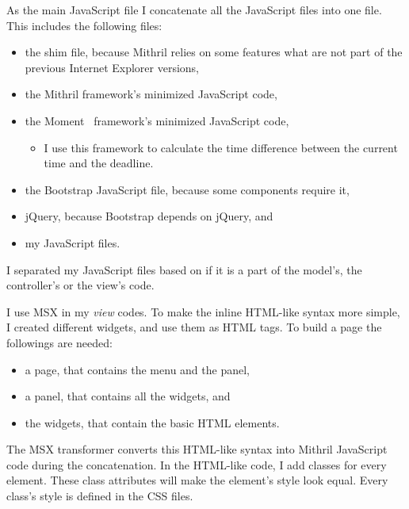 
As the main JavaScript file I concatenate all the JavaScript files into one file. This includes the following files: 
\begin{itemize}
	\item the shim file, because Mithril relies on some features what are not part of the previous Internet Explorer versions,
	\item the Mithril framework's minimized JavaScript code,
	\item the Moment~\cite{moment} framework's minimized JavaScript code,
	\begin{itemize}
		\item I use this framework to calculate the time difference between the current time and the deadline.
	\end{itemize}
	\item the Bootstrap JavaScript file, because some components require it,
	\item jQuery, because Bootstrap depends on jQuery, and
	\item my JavaScript files.
\end{itemize}


I separated my JavaScript files based on if it is a part of the model's, the controller's or the view's code. 

I use MSX in my \emph{view} codes. To make the inline HTML-like syntax more simple, I created different widgets, and use them as HTML tags. To build a page the followings are needed: 
\begin{itemize}
	\item a page, that contains the menu and the panel,
	\item a panel, that contains all the widgets, and
	\item the widgets, that contain the basic HTML elements.
\end{itemize}

The MSX transformer converts this HTML-like syntax into Mithril JavaScript code during the concatenation. In the HTML-like code, I add classes for every element. These class attributes will make the element's style look equal. Every class's style is defined in the CSS files.

